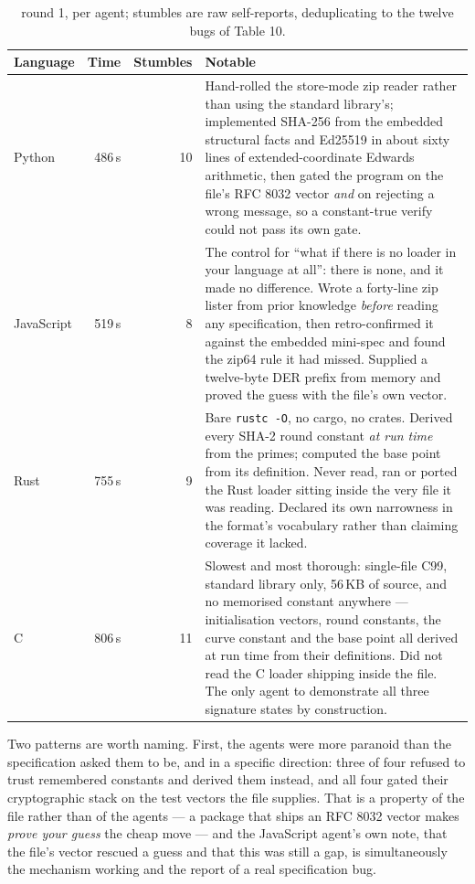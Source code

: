 \documentclass[10pt,twocolumn,letterpaper]{article}
\newcommand{\code}[1]{\texttt{\small #1}}
\begin{document}
\begin{table}[t]\centering\footnotesize
\caption{round 1, per agent; stumbles are raw self-reports, deduplicating to the twelve bugs of Table 10.}
\begin{tabular}{@{}l r r L{4.9cm}@{}}
\toprule
Language & Time & Stumbles & Notable \\
\midrule
Python & 486\,s & 10 & Hand-rolled the store-mode zip reader rather than using the standard library's; implemented SHA-256 from the embedded structural facts and Ed25519 in about sixty lines of extended-coordinate Edwards arithmetic, then gated the program on the file's RFC 8032 vector \emph{and} on rejecting a wrong message, so a constant-true verify could not pass its own gate. \\
JavaScript & 519\,s & 8 & The control for ``what if there is no loader in your language at all'': there is none, and it made no difference. Wrote a forty-line zip lister from prior knowledge \emph{before} reading any specification, then retro-confirmed it against the embedded mini-spec and found the zip64 rule it had missed. Supplied a twelve-byte DER prefix from memory and proved the guess with the file's own vector. \\
Rust & 755\,s & 9 & Bare \code{rustc -O}, no cargo, no crates. Derived every SHA-2 round constant \emph{at run time} from the primes; computed the base point from its definition. Never read, ran or ported the Rust loader sitting inside the very file it was reading. Declared its own narrowness in the format's vocabulary rather than claiming coverage it lacked. \\
C & 806\,s & 11 & Slowest and most thorough: single-file C99, standard library only, 56\,KB of source, and no memorised constant anywhere --- initialisation vectors, round constants, the curve constant and the base point all derived at run time from their definitions. Did not read the C loader shipping inside the file. The only agent to demonstrate all three signature states by construction. \\
\bottomrule
\end{tabular}
\end{table}

Two patterns are worth naming. First, the agents were more paranoid than the specification asked them to be, and in a specific direction: three of four refused to trust remembered constants and derived them instead, and all four gated their cryptographic stack on the test vectors the file supplies. That is a property of the file rather than of the agents --- a package that ships an RFC 8032 vector makes \emph{prove your guess} the cheap move --- and the JavaScript agent's own note, that the file's vector rescued a guess and that this was still a gap, is simultaneously the mechanism working and the report of a real specification bug.
\end{document}
